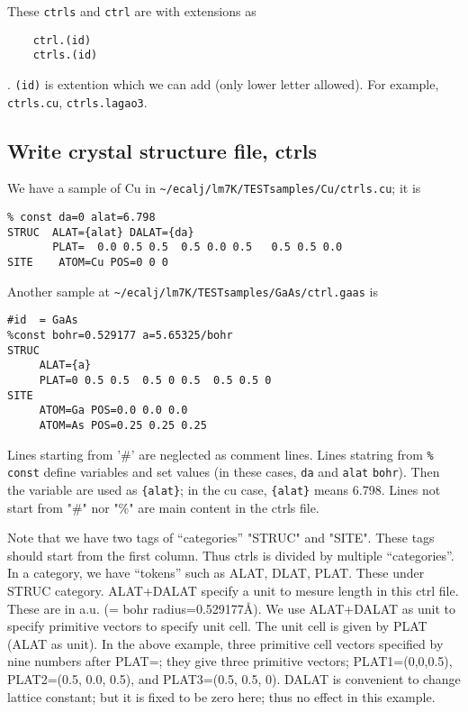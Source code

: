 \documentclass[a4paper,10pt,epsf,fleqn]{article}
\begin{document}
These \verb+ctrls+ and \verb+ctrl+ are with extensions as
\begin{verbatim}
    ctrl.(id)
    ctrls.(id)
\end{verbatim}
. \verb+(id)+ is extention which we can add
(only lower letter allowed). For example, \verb+ctrls.cu+, \verb+ctrls.lagao3+. 



\subsection{Write crystal structure file, ctrls}
\label{ctrls}

We have a sample of Cu in \verb+~/ecalj/lm7K/TESTsamples/Cu/ctrls.cu+; it is
\begin{verbatim}
% const da=0 alat=6.798
STRUC  ALAT={alat} DALAT={da}
       PLAT=  0.0 0.5 0.5  0.5 0.0 0.5   0.5 0.5 0.0
SITE    ATOM=Cu POS=0 0 0
\end{verbatim}

Another sample at \verb+~/ecalj/lm7K/TESTsamples/GaAs/ctrl.gaas+ is
\begin{verbatim}
#id  = GaAs
%const bohr=0.529177 a=5.65325/bohr 
STRUC
     ALAT={a} 
     PLAT=0 0.5 0.5  0.5 0 0.5  0.5 0.5 0 
SITE
     ATOM=Ga POS=0.0 0.0 0.0
     ATOM=As POS=0.25 0.25 0.25
\end{verbatim}

Lines starting from '\#' are neglected as comment lines.
Lines statring from \verb+% const+ define variables and set values
(in these cases, \verb+da+ and \verb+alat+ \verb+bohr+). 
Then the variable are used as \verb+{alat}+; in the cu case,
\verb+{alat}+ means 6.798.
Lines not start from "\#" nor "\%" are main content in the ctrls file.

Note that we have two tags of ``categories'' "STRUC" and "SITE". 
These tags should start from the first column. 
Thus ctrls is divided by multiple ``categories''.
In a category, we have ``tokens'' such as ALAT, DLAT, PLAT. 
These under STRUC category. 
ALAT+DALAT specify a unit to mesure length in this ctrl file.
These are in a.u. (= bohr radius=0.529177\AA). 
We use ALAT+DALAT as unit to specify primitive vectors to specify unit cell.
The unit cell is given by PLAT (ALAT as unit).
In the above example, three primitive cell vectors specified by nine
numbers after PLAT=; they give three primitive vectors;
PLAT1=(0,0,0.5), PLAT2=(0.5, 0.0, 0.5), and PLAT3=(0.5, 0.5, 0). 
DALAT is convenient to change lattice constant; but it is fixed to be
zero here; thus no effect in this example.
\end{document}

